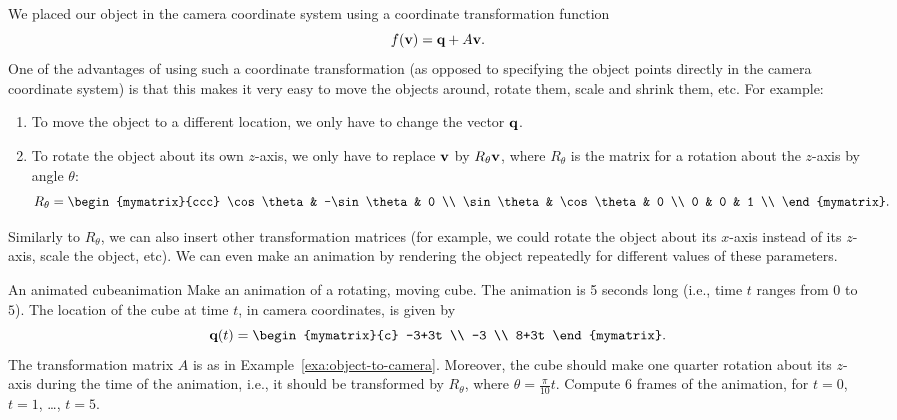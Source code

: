 We placed our object in the camera coordinate system using a
coordinate transformation function
\begin{equation*}
  f(\mbox{\bf v}) = \mbox{\bf q} + A\mbox{\bf v}.
\end{equation*}
One of the advantages of using such a coordinate transformation (as
opposed to specifying the object points directly in the camera
coordinate system) is that this makes it very easy to move the objects
around, rotate them, scale and shrink them, etc. For example:
\begin{enumerate}
\item To move the object to a different location, we only have to
  change the vector $\mbox{\bf q}$.
\item To rotate the object about its own $z$-axis, we only have to
  replace $\mbox{\bf v}$ by $R_{\theta}\mbox{\bf v}$, where $R_{\theta}$ is the matrix for a
  rotation about the $z$-axis by angle $\theta$:
  \begin{equation*}
    R_{\theta} = \begin{mymatrix}{ccc}
      \cos\theta & -\sin\theta & 0 \\
      \sin\theta & \cos\theta & 0 \\
      0 & 0 & 1 \\
    \end{mymatrix}.
  \end{equation*}
\end{enumerate}
Similarly to $R_{\theta}$, we can also insert other transformation
matrices (for example, we could rotate the object about its $x$-axis
instead of its $z$-axis, scale the object, etc).  We can even make an
animation by rendering the object repeatedly for different values of
these parameters.

\begin{example}{An animated cube}{animation}
  Make an animation of a rotating, moving cube. The animation is 5
  seconds long (i.e., time $t$ ranges from $0$ to $5$). The location
  of the cube at time $t$, in camera coordinates, is given by
  \begin{equation*}
    \vect{q}(t) =
    \begin{mymatrix}{c} -3+3t \\ -3 \\ 8+3t \end{mymatrix}.
  \end{equation*}
  The transformation matrix $A$ is as in
  Example~\ref{exa:object-to-camera}. Moreover, the cube should make
  one quarter rotation about its $z$-axis during the time of the
  animation, i.e., it should be transformed by $R_{\theta}$, where
  $\theta=\frac{\pi}{10}t$. Compute $6$ frames of the animation, for
  $t=0$, $t=1$, \ldots, $t=5$.
\end{example}

